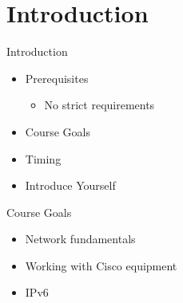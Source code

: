 \section[intro]{Introduction}

\begin{frame}{Introduction}
	\begin{itemize}[<+->]
		\item Prerequisites
		\begin{itemize}
			\item No strict requirements
		\end{itemize}
		\item Course Goals
		\item Timing
		\item Introduce Yourself
	\end{itemize}
\end{frame}

\begin{frame}{Course Goals}
	\begin{itemize}
		\item Network fundamentals
		\item Working with Cisco equipment
		\item IPv6
	\end{itemize}
\end{frame}
